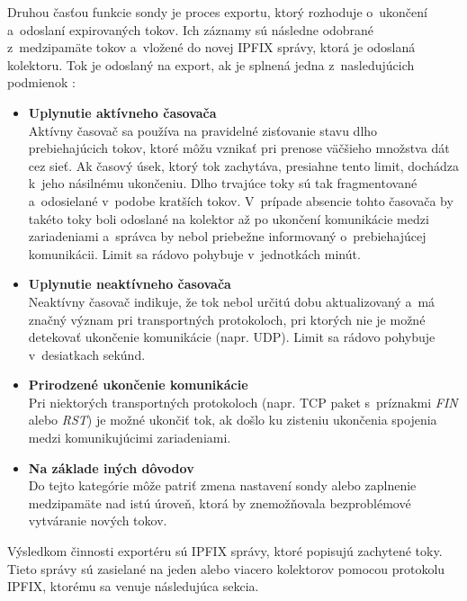 Druhou časťou funkcie sondy je proces exportu, ktorý rozhoduje o~ukončení a~odoslaní expirovaných tokov. Ich záznamy sú následne odobrané z~medzipamäte tokov a~vložené do novej IPFIX správy, ktorá je odoslaná kolektoru. Tok je odoslaný na export, ak je splnená
jedna z~nasledujúcich podmienok \cite{hutak}:

\begin{itemize}
    \item \textbf{Uplynutie aktívneho časovača}\\
    Aktívny časovač sa používa na pravidelné zisťovanie stavu dlho prebiehajúcich tokov, ktoré môžu vznikať pri prenose väčšieho množstva dát cez sieť. Ak časový úsek, ktorý tok zachytáva, presiahne tento limit, dochádza k~jeho násilnému ukončeniu. Dlho trvajúce toky sú tak
    fragmentované a~odosielané v~podobe kratších tokov. V~prípade absencie tohto časovača by takéto toky boli odoslané na kolektor až po ukončení komunikácie medzi zariadeniami a~správca by nebol priebežne informovaný o~prebiehajúcej komunikácii.
    Limit sa rádovo pohybuje v~jednotkách minút.
    \item \textbf{Uplynutie neaktívneho časovača}\\
    Neaktívny časovač indikuje, že tok nebol určitú dobu aktualizovaný a~má značný význam pri transportných protokoloch, pri ktorých nie je možné detekovať ukončenie komunikácie (napr. UDP).
    Limit sa rádovo pohybuje v~desiatkach sekúnd.
    \item \textbf{Prirodzené ukončenie komunikácie}\\
    Pri niektorých transportných protokoloch (napr. TCP paket s~príznakmi \textit{FIN} alebo \textit{RST}) je možné ukončiť tok, ak došlo ku zisteniu ukončenia spojenia medzi komunikujúcimi zariadeniami.
    \item \textbf{Na základe iných dôvodov}\\
    Do tejto kategórie môže patriť zmena nastavení sondy alebo zaplnenie medzipamäte nad istú úroveň, ktorá by znemožňovala bezproblémové vytváranie nových tokov.
\end{itemize}

Výsledkom činnosti exportéru sú IPFIX správy, ktoré popisujú zachytené toky. Tieto správy sú zasielané na jeden alebo viacero kolektorov pomocou protokolu IPFIX, ktorému sa venuje následujúca sekcia.
\newpage

